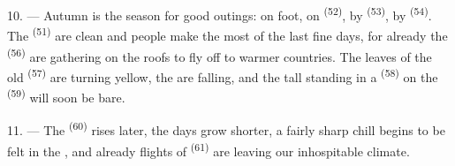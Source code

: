 10. --- Autumn is the season for good outings: on foot, on
 \textsuperscript{(52)}, by  \textsuperscript{(53)}, by
 \textsuperscript{(54)}. The  \textsuperscript{(51)} are clean and
people make the most of the last fine days, for already the
 \textsuperscript{(56)} are gathering on the roofs to fly off to
warmer countries. The leaves of the old  \textsuperscript{(57)}
are turning yellow, the  are falling, and the tall
 standing in a  \textsuperscript{(58)} on the
 \textsuperscript{(59)} will soon be bare.

11. --- The  \textsuperscript{(60)} rises later, the days grow shorter, a
fairly sharp chill begins to be felt in the , and already
flights of  \textsuperscript{(61)} are leaving our inhospitable
climate.
\VUsaut{6.0mm}
\VUfilet{22mm}
